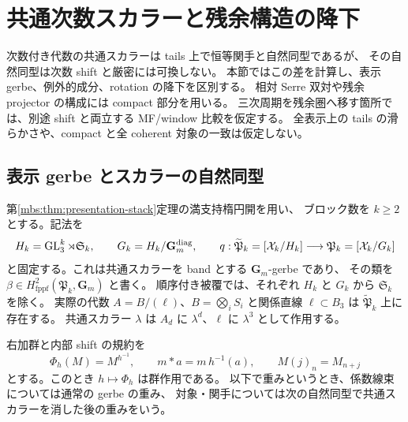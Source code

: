\section{共通次数スカラーと残余構造の降下}
\label{mbsd2:sec:scalar-descent}

次数付き代数の共通スカラーは tails 上で恒等関手と自然同型であるが、
その自然同型は次数 shift と厳密には可換しない。
本節ではこの差を計算し、表示 gerbe、例外的成分、rotation の降下を区別する。
相対 Serre 双対や残余 projector の構成には compact 部分を用いる。
三次周期を残余圏へ移す箇所では、別途 shift と両立する MF/window 比較を仮定する。
全表示上の tails の滑らかさや、compact と全 coherent 対象の一致は仮定しない。

\subsection{表示 gerbe とスカラーの自然同型}

第\ref{mbs:thm:presentation-stack}定理の満支持楕円開を用い、
ブロック数を $k\geq2$ とする。記法を
\[
 H_k=\operatorname{GL}_3^k\rtimes\mathfrak S_k,
 \qquad G_k=H_k/\mathbf G_m^{\mathrm{diag}},
 \qquad
 q:\widetilde{\mathfrak P}_k=[\mathcal X_k/H_k]
       \longrightarrow\mathfrak P_k=[\mathcal X_k/G_k]
\]
と固定する。これは共通スカラーを band とする $\mathbf G_m$-gerbe であり、
その類を $\beta\in H^2_{\mathrm{fppf}}(\mathfrak P_k,\mathbf G_m)$ と書く。
順序付き被覆では、それぞれ $H_k$ と $G_k$ から $\mathfrak S_k$ を除く。
実際の代数 $A=B/(\ell)$、$B=\bigotimes_iS_i$ と関係直線 $\ell\subset B_3$ は
$\widetilde{\mathfrak P}_k$ 上に存在する。
共通スカラー $\lambda$ は $A_d$ に $\lambda^d$、$\ell$ に $\lambda^3$ として作用する。

右加群と内部 shift の規約を
\begin{equation}\label{mbsd2:eq:convention}
 \Phi_h(M)=M^{h^{-1}},\qquad m*a=m\,h^{-1}(a),
 \qquad M(j)_n=M_{n+j}
\end{equation}
とする。このとき $h\mapsto\Phi_h$ は群作用である。
以下で重みというとき、係数線束については通常の gerbe の重み、
対象・関手については次の自然同型で共通スカラーを消した後の重みをいう。

